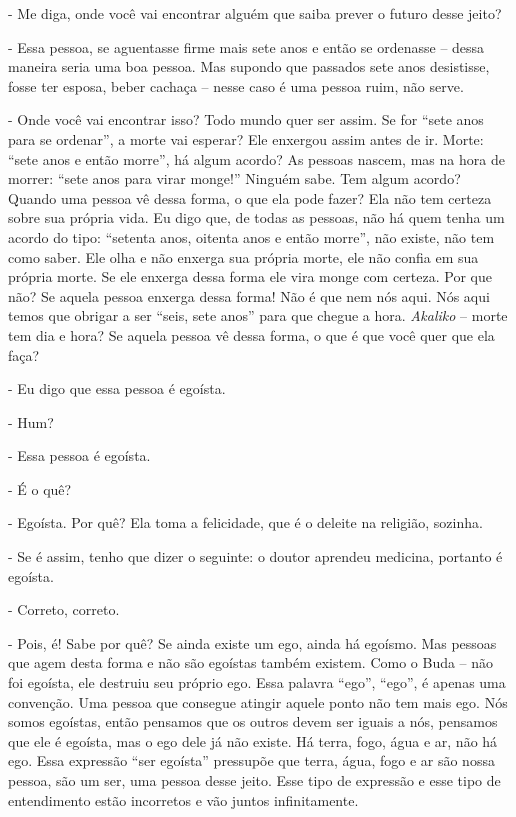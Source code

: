 {}- Me diga, onde você vai encontrar alguém que saiba prever o
futuro desse jeito?

{}- Essa pessoa, se aguentasse firme mais sete anos e então se
ordenasse – dessa maneira seria uma boa pessoa. Mas supondo que
passados sete anos desistisse, fosse ter esposa, beber cachaça – nesse
caso é uma pessoa ruim, não serve.

{}- Onde você vai encontrar isso? Todo mundo quer ser assim. Se for
“sete anos para se ordenar”, a morte vai esperar? Ele enxergou assim
antes de ir. Morte: “sete anos e então morre”, há algum acordo? As
pessoas nascem, mas na hora de morrer: “sete anos para virar monge!”
Ninguém sabe. Tem algum acordo? Quando uma pessoa vê dessa forma, o que
ela pode fazer? Ela não tem certeza sobre sua própria vida. Eu digo
que, de todas as pessoas, não há quem tenha um acordo do tipo: “setenta
anos, oitenta anos e então morre”, não existe, não tem como saber. Ele
olha e não enxerga sua própria morte, ele não confia em sua própria
morte. Se ele enxerga dessa forma ele vira monge com certeza. Por que
não? Se aquela pessoa enxerga dessa forma! Não é que nem nós aqui. Nós
aqui temos que obrigar a ser “seis, sete anos” para que chegue a hora.
\textit{Akaliko} – morte tem dia e hora? Se aquela pessoa vê dessa
forma, o que é que você quer que ela faça? 

{}- Eu digo que essa pessoa é egoísta. 

{}- Hum?

{}- Essa pessoa é egoísta.

{}- É o quê?

{}- Egoísta. Por quê? Ela toma a felicidade, que é o deleite na
religião, sozinha. 

{}- Se é assim, tenho que dizer o seguinte: o doutor aprendeu
medicina, portanto é egoísta.

{}- Correto, correto.

{}- Pois, é! Sabe por quê? Se ainda existe um ego, ainda há egoísmo.
Mas pessoas que agem desta forma e não são egoístas também existem.
Como o Buda – não foi egoísta, ele destruiu seu próprio ego. Essa
palavra “ego”, “ego”, é apenas uma convenção. Uma pessoa que consegue
atingir aquele ponto não tem mais ego. Nós somos egoístas, então
pensamos que os outros devem ser iguais a nós, pensamos que ele é
egoísta, mas o ego dele já não existe. Há terra, fogo, água e ar, não
há ego. Essa expressão “ser egoísta” pressupõe que terra, água, fogo e
ar são nossa pessoa, são um ser, uma pessoa desse jeito. Esse tipo de
expressão e esse tipo de entendimento estão incorretos e vão juntos
infinitamente. 

